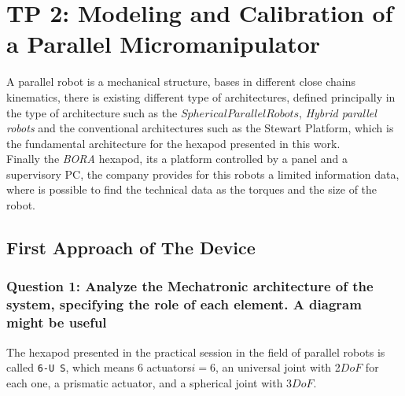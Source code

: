 \documentclass[12pt, twoside]{report}
\newcommand\barbelow[1]{\stackunder[1.2pt]{$#1$}{\rule{.8ex}{.075ex}}}
\begin{document}
\chapter{TP 2: \LARGE Modeling and Calibration of a Parallel Micromanipulator }
A parallel robot is a mechanical structure, bases in different close chains kinematics, there is existing different type of architectures, defined principally in the type of architecture such as the $Spherical Parallel Robots$, \textit{Hybrid parallel robots} and the conventional architectures such as the Stewart Platform, which is the fundamental architecture for the hexapod presented in this work.\\
Finally the \textit{BORA} hexapod, its a platform controlled by a panel and a supervisory PC, the company provides for this robots a limited information data, where is possible to find the technical data as the torques and the size of the robot.

\section{First Approach of The Device}

\subsection{\textbf{Question 1:} Analyze the Mechatronic architecture of the system, specifying the role of each
element. A diagram might be useful}

The hexapod presented in the practical session in the field of parallel robots is called \texttt{6-U \barbelow{P} S}, which means 6 actuators$i=6$, an universal joint with 2$DoF$ for each one, a prismatic actuator, and a spherical joint with 3$DoF$. 
\end{document}
